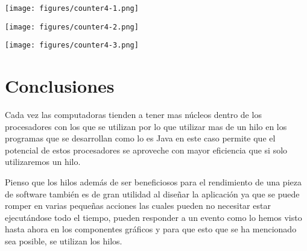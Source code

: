\documentclass[12pt]{article}
\begin{document}
\begin{center}
  \texttt{[image: figures/counter4-1.png]}
\end{center}

\begin{center}
  \texttt{[image: figures/counter4-2.png]}
\end{center}

\begin{center}
  \texttt{[image: figures/counter4-3.png]}
\end{center}

\section*{Conclusiones}

Cada vez las computadoras tienden a tener mas núcleos dentro de los
procesadores con los que se utilizan por lo que utilizar mas de un
hilo en los programas que se desarrollan como lo es Java en este caso
permite que el potencial de estos procesadores se aproveche con mayor
eficiencia que si solo utilizaremos un hilo.

Pienso que los hilos además de ser beneficiosos para el rendimiento
de una pieza de software también es de gran utilidad al diseñar la
aplicación ya que se puede romper en varias pequeñas acciones las
cuales pueden no necesitar estar ejecutándose todo el tiempo, pueden
responder a un evento como lo hemos visto hasta ahora en los
componentes gráficos y para que esto que se ha mencionado sea posible,
se utilizan los hilos.
\end{document}
